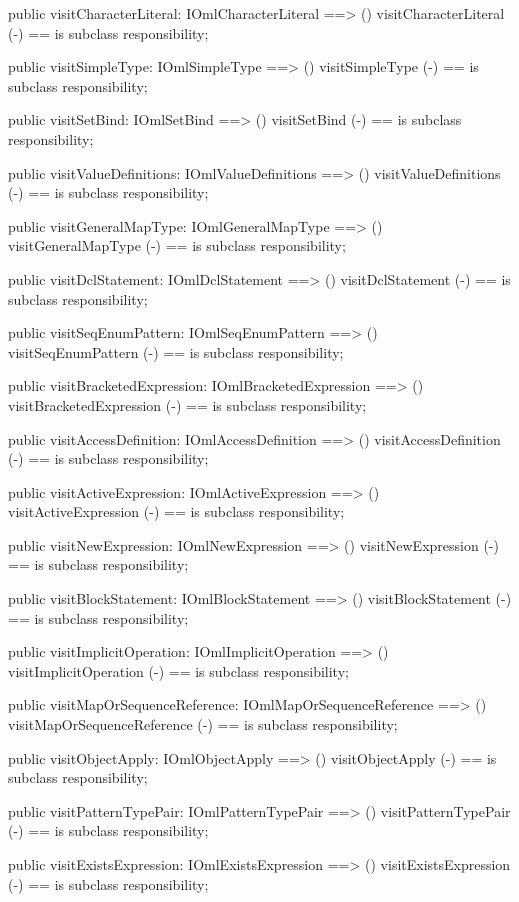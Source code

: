 \begin{vdm_al}
  public visitCharacterLiteral: IOmlCharacterLiteral ==> ()
  visitCharacterLiteral (-) == is subclass responsibility;

  public visitSimpleType: IOmlSimpleType ==> ()
  visitSimpleType (-) == is subclass responsibility;

  public visitSetBind: IOmlSetBind ==> ()
  visitSetBind (-) == is subclass responsibility;

  public visitValueDefinitions: IOmlValueDefinitions ==> ()
  visitValueDefinitions (-) == is subclass responsibility;

  public visitGeneralMapType: IOmlGeneralMapType ==> ()
  visitGeneralMapType (-) == is subclass responsibility;

  public visitDclStatement: IOmlDclStatement ==> ()
  visitDclStatement (-) == is subclass responsibility;

  public visitSeqEnumPattern: IOmlSeqEnumPattern ==> ()
  visitSeqEnumPattern (-) == is subclass responsibility;

  public visitBracketedExpression: IOmlBracketedExpression ==> ()
  visitBracketedExpression (-) == is subclass responsibility;

  public visitAccessDefinition: IOmlAccessDefinition ==> ()
  visitAccessDefinition (-) == is subclass responsibility;

  public visitActiveExpression: IOmlActiveExpression ==> ()
  visitActiveExpression (-) == is subclass responsibility;

  public visitNewExpression: IOmlNewExpression ==> ()
  visitNewExpression (-) == is subclass responsibility;

  public visitBlockStatement: IOmlBlockStatement ==> ()
  visitBlockStatement (-) == is subclass responsibility;

  public visitImplicitOperation: IOmlImplicitOperation ==> ()
  visitImplicitOperation (-) == is subclass responsibility;

  public visitMapOrSequenceReference: IOmlMapOrSequenceReference ==> ()
  visitMapOrSequenceReference (-) == is subclass responsibility;

  public visitObjectApply: IOmlObjectApply ==> ()
  visitObjectApply (-) == is subclass responsibility;

  public visitPatternTypePair: IOmlPatternTypePair ==> ()
  visitPatternTypePair (-) == is subclass responsibility;

  public visitExistsExpression: IOmlExistsExpression ==> ()
  visitExistsExpression (-) == is subclass responsibility;


\end{vdm_al}
